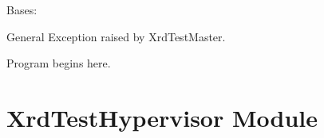 \documentclass[letterpaper,10pt,english]{sphinxmanual}
\begin{document}

\begin{fulllineitems}
\label{ref-manual/XrdTestMaster:XrdTestMaster.XrdTestMasterException}
Bases: 

General Exception raised by XrdTestMaster.

\end{fulllineitems}


\begin{fulllineitems}
\label{ref-manual/XrdTestMaster:XrdTestMaster.main}
Program begins here.

\end{fulllineitems}



\section{XrdTestHypervisor Module}
\label{ref-manual/XrdTestHypervisor:xrdtesthypervisor-module}\label{ref-manual/XrdTestHypervisor::doc}\label{ref-manual/XrdTestHypervisor:module-XrdTestHypervisor}
\end{document}
